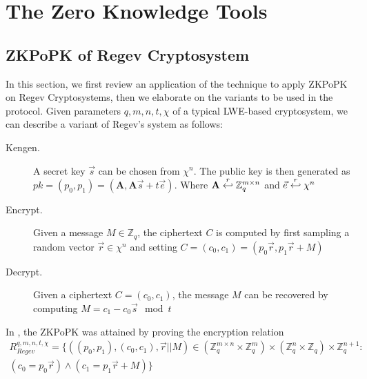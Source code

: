 \section{The Zero Knowledge Tools}
\label{sec:zkptools}
\subsection{ZKPoPK of Regev Cryptosystem}
\label{sec:zkpRegev}
In this section, we first review an application of the \cite{ling2013improved} technique to apply ZKPoPK on Regev Cryptosystems, then we elaborate on the variants to be used in the protocol.
Given parameters $q, m, n, t, \chi$ of a typical LWE-based cryptosystem, we can describe a variant of Regev's system as follows:
\begin{description}
\item [Kengen.] A secret key $\vec{s}$ can be chosen from $\chi^n$. The public key is then generated as
  $pk = (p_0, p_1) = (\mathbf{A}, \mathbf{A}\vec{s} + t\vec{e})$. Where $\mathbf{A} \stackrel{r}{\hookleftarrow} \mathbb{Z}_q^{m \times n}$
  and $\vec{e} \stackrel{r}{\hookleftarrow} \chi^n$
\item [Encrypt.] Given a message $M \in \mathbb{Z}_q$, the ciphertext $C$ is computed by first sampling a random
  vector $\vec{r} \in \chi^n$ and setting
  $C = (c_0, c_1) = (p_0\vec{r}, p_1\vec{r} + M)$
\item [Decrypt.] Given a ciphertext $C = (c_0, c_1)$, the message $M$ can be recovered by computing $M = c_1 - c_0\vec{s} \mod t$
\end{description}
In \cite{ling2013improved}, the ZKPoPK was attained by proving the encryption relation
\begin{align*}
  R_{Regev}^{q,m,n,t,\chi} = \{ ((p_0,p_1),(c_0,c_1),\vec{r}||M) \in (\mathbb{Z}_q^{m \times n} \times \mathbb{Z}_q^{m})
  \times (\mathbb{Z}_q^n \times \mathbb{Z}_q) \times \mathbb{Z}_q^{n+1} : \\
  (c_0 = p_0\vec{r}) \land (c_1 = p_1\vec{r} + M) \}
\end{align*}

